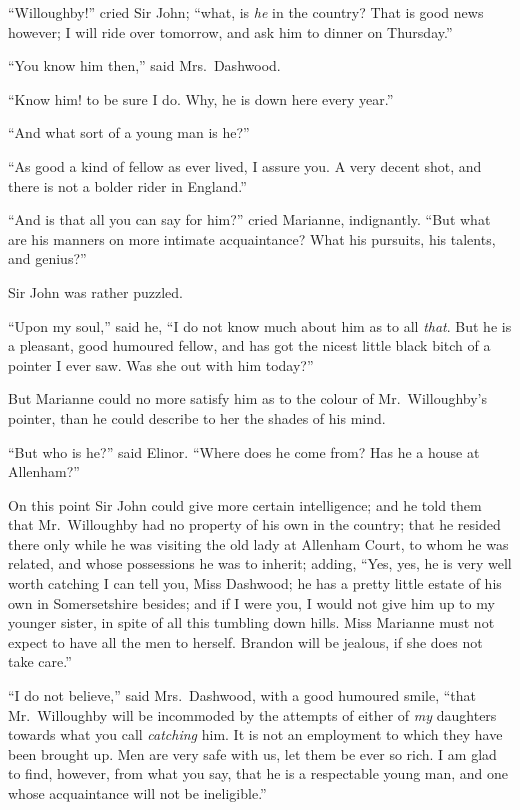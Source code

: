 ``Willoughby!'' cried Sir John; ``what, is \emph{he}
in the country? That is good news however; I will
ride over tomorrow, and ask him to dinner on Thursday.''

``You know him then,'' said Mrs.\ Dashwood.

``Know him! to be sure I do.  Why, he is down here
every year.''

``And what sort of a young man is he?''

``As good a kind of fellow as ever lived, I assure you.
A very decent shot, and there is not a bolder rider
in England.''

``And is that all you can say for him?'' cried Marianne,
indignantly.  ``But what are his manners on more intimate
acquaintance? What his pursuits, his talents, and genius?''

Sir John was rather puzzled.

``Upon my soul,'' said he, ``I do not know much about him
as to all \emph{that}.  But he is a pleasant, good humoured fellow,
and has got the nicest little black bitch of a pointer
I ever saw.  Was she out with him today?''

But Marianne could no more satisfy him as to the
colour of Mr.\ Willoughby's pointer, than he could
describe to her the shades of his mind.

``But who is he?'' said Elinor.  ``Where does he come
from?  Has he a house at Allenham?''

On this point Sir John could give more certain intelligence;
and he told them that Mr.\ Willoughby had no property
of his own in the country; that he resided there only
while he was visiting the old lady at Allenham Court,
to whom he was related, and whose possessions he was
to inherit; adding, ``Yes, yes, he is very well worth
catching I can tell you, Miss Dashwood; he has a pretty
little estate of his own in Somersetshire besides;
and if I were you, I would not give him up to my
younger sister, in spite of all this tumbling down hills.
Miss Marianne must not expect to have all the men to herself.
Brandon will be jealous, if she does not take care.''

``I do not believe,'' said Mrs.\ Dashwood, with a
good humoured smile, ``that Mr.\ Willoughby will be incommoded
by the attempts of either of \emph{my} daughters towards what
you call \emph{catching} him.  It is not an employment to which
they have been brought up.  Men are very safe with us,
let them be ever so rich.  I am glad to find, however,
from what you say, that he is a respectable young man,
and one whose acquaintance will not be ineligible.''

